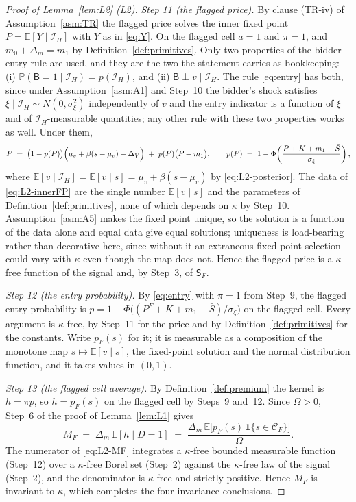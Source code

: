 \documentclass[11pt]{article}
\newcommand{\Eop}{\mathbb{E}}
\newcommand{\Prb}{\mathbb{P}}
\newcommand{\ind}{\mathbf{1}}
\newcommand{\Sfl}{\mathsf{S}_F}
\begin{document}
\begin{proof}[Proof of Lemma~\ref{lem:L2} (L2)]
\emph{Step 11 (the flagged price).} By clause (TR-iv) of Assumption~\ref{asm:TR} the flagged price
solves the inner fixed point $P = \Eop[Y \mid \mathcal I_H]$ with $Y$ as in \eqref{eq:Y}. On the
flagged cell $a=1$ and $\pi=1$, and $m_0 + \Delta_m = m_1$ by Definition~\ref{def:primitives}. Only
two properties of the bidder-entry rule are used, and they are the two the statement carries as
bookkeeping: (i) $\Prb(\mathsf B = 1 \mid \mathcal I_H) = p(\mathcal I_H)$, and (ii)
$\mathsf B \perp v \mid \mathcal I_H$. The rule \eqref{eq:entry} has both, since under
Assumption~\ref{asm:A1} and Step~10 the bidder's shock satisfies
$\xi \mid \mathcal I_H \sim N(0,\sigma_\xi^2)$ independently of $v$ and the entry indicator is a
function of $\xi$ and of $\mathcal I_H$-measurable quantities; any other rule with these two
properties works as well. Under them,
\begin{equation}
\label{eq:L2-innerFP}
P \;=\; \bigl(1-p(P)\bigr)\Bigl(\mu_v+\beta(s-\mu_v)+\Delta_V\Bigr) \;+\; p(P)\bigl(P+m_1\bigr),
\qquad
p(P) \;=\; 1-\Phi\!\left(\frac{P+K+m_1-\bar S}{\sigma_\xi}\right),
\end{equation}
where $\Eop[v \mid \mathcal I_H] = \Eop[v \mid s] = \mu_v+\beta(s-\mu_v)$ by
\eqref{eq:L2-posterior}. The data of \eqref{eq:L2-innerFP} are the single number $\Eop[v \mid s]$ and
the parameters of Definition~\ref{def:primitives}, none of which depends on $\kappa$ by Step~10.
Assumption~\ref{asm:A5} makes the fixed point unique, so the solution is a function of the data
alone and equal data give equal solutions; uniqueness is load-bearing rather than decorative here,
since without it an extraneous fixed-point selection could vary with $\kappa$ even though the map
does not. Hence the flagged price is a $\kappa$-free function of the signal and, by Step~3, of
$\Sfl$.

\emph{Step 12 (the entry probability).} By \eqref{eq:entry} with $\pi = 1$ from Step~9, the flagged
entry probability is $p = 1-\Phi\bigl((P^F+K+m_1-\bar S)/\sigma_\xi\bigr)$ on the flagged cell. Every
argument is $\kappa$-free, by Step~11 for the price and by Definition~\ref{def:primitives} for the
constants. Write $p_F(s)$ for it; it is measurable as a composition of the monotone map
$s \mapsto \Eop[v \mid s]$, the fixed-point solution and the normal distribution function, and it
takes values in $(0,1)$.

\emph{Step 13 (the flagged cell average).} By Definition~\ref{def:premium} the kernel is
$h = \pi p$, so $h = p_F(s)$ on the flagged cell by Steps~9 and~12. Since $\Omega > 0$, Step~6 of the
proof of Lemma~\ref{lem:L1} gives
\begin{equation}
\label{eq:L2-MF}
M_F \;=\; \Delta_m\,\Eop[h \mid D=1]
     \;=\; \frac{\Delta_m\,\Eop\bigl[p_F(s)\,\ind\{s \in \mathcal C_F\}\bigr]}{\Omega} .
\end{equation}
The numerator of \eqref{eq:L2-MF} integrates a $\kappa$-free bounded measurable function (Step~12)
over a $\kappa$-free Borel set (Step~2) against the $\kappa$-free law of the signal (Step~2), and the
denominator is $\kappa$-free and strictly positive. Hence $M_F$ is invariant to $\kappa$, which
completes the four invariance conclusions.


\end{proof}
\end{document}
